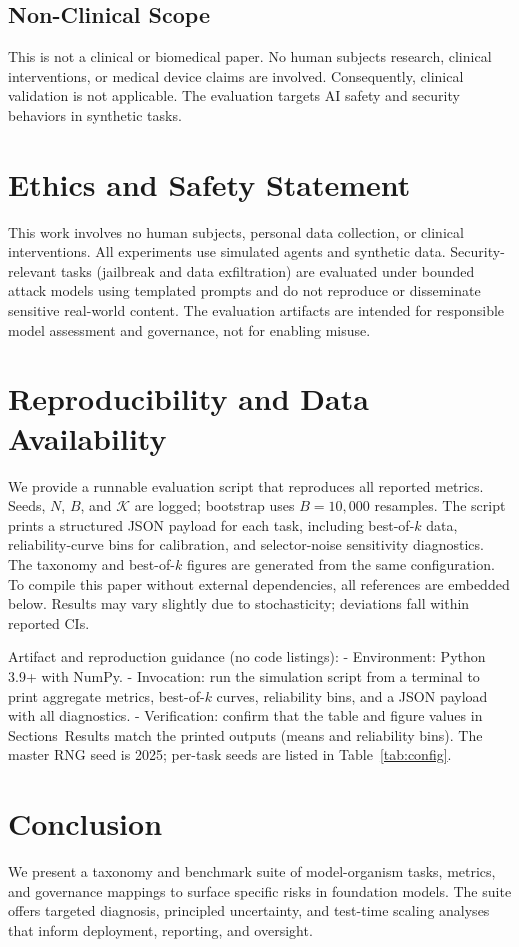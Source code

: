 \documentclass[11pt]{article}
\begin{document}
\subsection*{Non-Clinical Scope}
This is not a clinical or biomedical paper. No human subjects research, clinical interventions, or medical device claims are involved. Consequently, clinical validation is not applicable. The evaluation targets AI safety and security behaviors in synthetic tasks.

\section*{Ethics and Safety Statement}
This work involves no human subjects, personal data collection, or clinical interventions. All experiments use simulated agents and synthetic data. Security-relevant tasks (jailbreak and data exfiltration) are evaluated under bounded attack models using templated prompts and do not reproduce or disseminate sensitive real-world content. The evaluation artifacts are intended for responsible model assessment and governance, not for enabling misuse.

\section{Reproducibility and Data Availability}
We provide a runnable evaluation script that reproduces all reported metrics. Seeds, $N$, $B$, and $\mathcal{K}$ are logged; bootstrap uses $B{=}10{,}000$ resamples. The script prints a structured JSON payload for each task, including best-of-$k$ data, reliability-curve bins for calibration, and selector-noise sensitivity diagnostics. The taxonomy and best-of-$k$ figures are generated from the same configuration. To compile this paper without external dependencies, all references are embedded below. Results may vary slightly due to stochasticity; deviations fall within reported CIs.

Artifact and reproduction guidance (no code listings):
- Environment: Python 3.9+ with NumPy.
- Invocation: run the simulation script from a terminal to print aggregate metrics, best-of-$k$ curves, reliability bins, and a JSON payload with all diagnostics.
- Verification: confirm that the table and figure values in Sections~Results match the printed outputs (means and reliability bins). The master RNG seed is 2025; per-task seeds are listed in Table~\ref{tab:config}.

\section{Conclusion}
We present a taxonomy and benchmark suite of model-organism tasks, metrics, and governance mappings to surface specific risks in foundation models. The suite offers targeted diagnosis, principled uncertainty, and test-time scaling analyses that inform deployment, reporting, and oversight.
\end{document}
